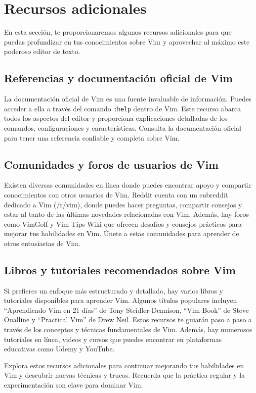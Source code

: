 \documentclass[
  a4paper,
]{article}
\begin{document}
\hypertarget{recursos-adicionales}{%
\section{Recursos adicionales}\label{recursos-adicionales}}

En esta sección, te proporcionaremos algunos recursos adicionales para
que puedas profundizar en tus conocimientos sobre Vim y aprovechar al
máximo este poderoso editor de texto.

\hypertarget{referencias-y-documentaciuxf3n-oficial-de-vim}{%
\subsection{Referencias y documentación oficial de
Vim}\label{referencias-y-documentaciuxf3n-oficial-de-vim}}

La documentación oficial de Vim es una fuente invaluable de información.
Puedes acceder a ella a través del comando \texttt{:help} dentro de Vim.
Este recurso abarca todos los aspectos del editor y proporciona
explicaciones detalladas de los comandos, configuraciones y
características. Consulta la documentación oficial para tener una
referencia confiable y completa sobre Vim.

\hypertarget{comunidades-y-foros-de-usuarios-de-vim}{%
\subsection{Comunidades y foros de usuarios de
Vim}\label{comunidades-y-foros-de-usuarios-de-vim}}

Existen diversas comunidades en línea donde puedes encontrar apoyo y
compartir conocimientos con otros usuarios de Vim. Reddit cuenta con un
subreddit dedicado a Vim (/r/vim), donde puedes hacer preguntas,
compartir consejos y estar al tanto de las últimas novedades
relacionadas con Vim. Además, hay foros como VimGolf y Vim Tips Wiki que
ofrecen desafíos y consejos prácticos para mejorar tus habilidades en
Vim. Únete a estas comunidades para aprender de otros entusiastas de
Vim.

\hypertarget{libros-y-tutoriales-recomendados-sobre-vim}{%
\subsection{Libros y tutoriales recomendados sobre
Vim}\label{libros-y-tutoriales-recomendados-sobre-vim}}

Si prefieres un enfoque más estructurado y detallado, hay varios libros
y tutoriales disponibles para aprender Vim. Algunos títulos populares
incluyen ``Aprendiendo Vim en 21 días'' de Tony Steidler-Dennison, ``Vim
Book'' de Steve Oualline y ``Practical Vim'' de Drew Neil. Estos
recursos te guiarán paso a paso a través de los conceptos y técnicas
fundamentales de Vim. Además, hay numerosos tutoriales en línea, videos
y cursos que puedes encontrar en plataformas educativas como Udemy y
YouTube.

Explora estos recursos adicionales para continuar mejorando tus
habilidades en Vim y descubrir nuevas técnicas y trucos. Recuerda que la
práctica regular y la experimentación son clave para dominar Vim.


\printbibliography
\end{document}
